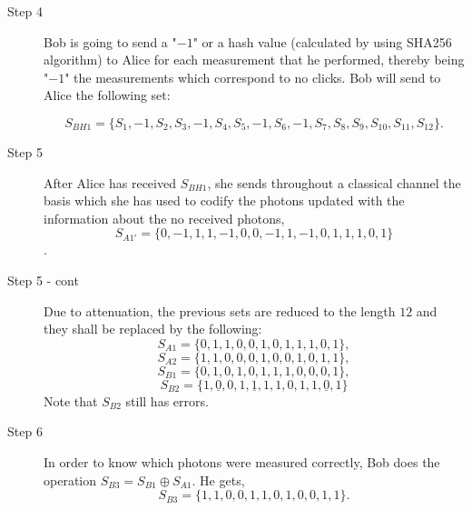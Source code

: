 
\large
\vspace*{0mm}

\begin{description}
  \item[Step 4] Bob is going to send a "$-1$"\space{ } or a hash value (calculated by using SHA256 algorithm) to Alice for each measurement that he performed, thereby being "$-1$"\space{ } the measurements which correspond to no clicks. Bob will send to Alice the following set:

       $$S_{BH1}=\{{S}_{1},-1,{S}_{2},{S}_{3}, -1,{S}_{4},{S}_{5},-1,{S}_{6},-1,{S}_{7},{S}_{8},{S}_{9},{S}_{10},{S}_{11},{S}_{12} \}.$$

  \item[Step 5] After Alice has received $S_{BH1}$, she sends throughout a classical channel the basis which she has used to codify the photons updated with the information about the no received photons, $$S_{A1'} = \{0,-1,1,1,-1,0,0,-1,1,-1,0,1,1,1,0,1 \}$$.
\end{description}


\large
\vspace*{4mm}

\begin{description}
  \item[Step 5 - cont] Due to attenuation, the previous sets are reduced to the length $12$ and they shall be replaced by the following:
      $$S_{A1}=\{0,1,1,0,0,1,0,1,1,1,0,1 \},$$
      $$S_{A2}=\{1,1,0,0,0,1,0,0,1,0,1,1 \},$$
      $$S_{B1}=\{0,1,0,1,0,1,1,1,0,0,0,1 \},$$
      $$S_{B2}=\{1,\underline{0},0,1,\underline{1},1,1,0,1,1,\underline{0},1 \}$$
      Note that $S_{B2}$ still has errors.
  \item [Step 6] In order to know which photons were measured correctly, Bob does the operation $S_{B3}=S_{B1} \oplus S_{A1}$. He gets,
  $$S_{B3} = \{1,1,0,0,1,1,0,1,0,0,1,1 \}.$$

\end{description}

